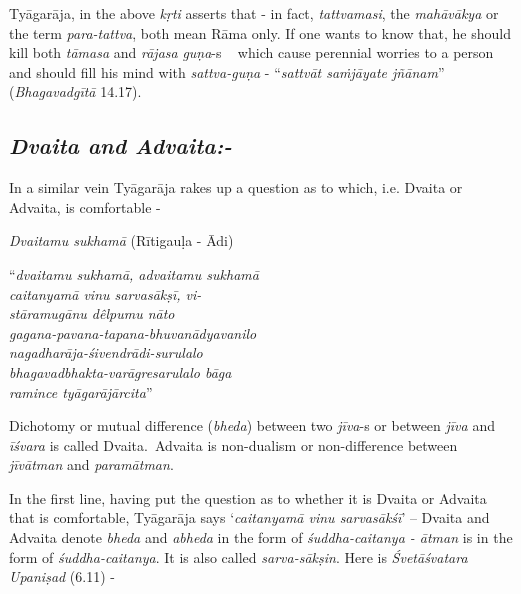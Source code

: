 Tyāgarāja, in the above \textit{kṛti} asserts that - in fact, \textit{tattvamasi}, the \textit{mahāvākya} or the term \textit{para-tattva}, both mean Rāma only. If one wants to know that, he should kill both \textit{tāmasa} and \textit{rājasa} \textit{guṇa}-s   which cause perennial worries to a person and should fill his mind with \textit{sattva-guṇa} - “\textit{sattvāt saṁjāyate jñānam}” (\textit{Bhagavadgītā} 14.17).

\vspace{-.3cm}

\subsection*{\textit{Dvaita and Advaita:-}}

\vspace{-.2cm}

In a similar vein Tyāgarāja rakes up a question as to which, i.e. Dvaita or Advaita, is comfortable - 

\textit{Dvaitamu sukhamā} (Rītigauḷa - Ādi)

\begin{centerquote}
“\textit{dvaitamu sukhamā, advaitamu sukhamā}\\ \textit{caitanyamā vinu sarvasākṣī, vi-}\\ \textit{stāramugānu dêlpumu nāto}\\ \textit{gagana-pavana-tapana-bhuvanādyavanilo}\\ \textit{nagadharāja-śivendrādi-surulalo}\\ \textit{bhagavadbhakta-varāgresarulalo bāga}\\ \textit{ramince tyāgarājārcita}”
\end{centerquote}


Dichotomy or mutual difference (\textit{bheda}) between two \textit{jīva}-s or between \textit{jīva} and \textit{īśvara} is called Dvaita.~Advaita is non-dualism or non-difference between \textit{jīvātman} and \textit{paramātman}. 

In the first line, having put the question as to whether it is Dvaita or Advaita that is comfortable, Tyāgarāja says ‘\textit{caitanyamā vinu sarvasākśī}’ – Dvaita and Advaita denote \textit{bheda} and \textit{abheda} in the form of \textit{śuddha-caitanya - ātman} is in the form of \textit{śuddha-caitanya}. It is also called \textit{sarva-sākṣin}. Here is \textit{Śvetāśvatara Upaniṣad} (6.11) -

